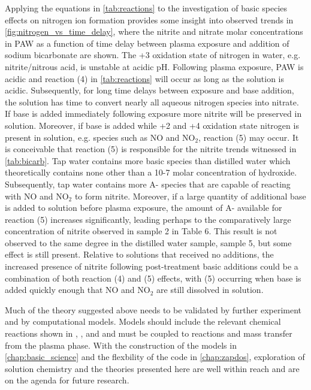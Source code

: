 Applying the equations in \cref{tab:reactions} to the investigation of basic species effects on nitrogen ion formation provides some insight into observed trends in \cref{fig:nitrogen_vs_time_delay}, where the nitrite and nitrate molar concentrations in PAW as a function of time delay between plasma exposure and addition of sodium bicarbonate are shown.  The +3 oxidation state of nitrogen in water, e.g. nitrite/nitrous acid, is unstable at acidic pH.  Following plasma exposure, PAW is acidic and reaction (4) in \cref{tab:reactions} will occur as long as the solution is acidic.  Subsequently, for long time delays between exposure and base addition, the solution has time to convert nearly all aqueous nitrogen species into nitrate.  If base is added immediately following exposure more nitrite will be preserved in solution.  Moreover, if base is added while +2 and +4 oxidation state nitrogen is present in solution, e.g. species such as NO and NO$_2$, reaction (5) may occur.  It is conceivable that reaction (5) is responsible for the nitrite trends witnessed in \cref{tab:bicarb}.  Tap water contains more basic species than distilled water which theoretically contains none other than a 10-7 molar concentration of hydroxide.  Subsequently, tap water contains more A- species that are capable of reacting with NO and NO$_2$ to form nitrite.  Moreover, if a large quantity of additional base is added to solution before plasma exposure, the amount of A- available for reaction (5) increases significantly, leading perhaps to the comparatively large concentration of nitrite observed in sample 2 in Table 6.  This result is not observed to the same degree in the distilled water sample, sample 5, but some effect is still present.  Relative to solutions that received no additions, the increased presence of nitrite following post-treatment basic additions could be a combination of both reaction (4) and (5) effects, with (5) occurring when base is added quickly enough that NO and NO$_2$ are still dissolved in solution.

Much of the theory suggested above needs to be validated by further experiment and by computational models.  Models should include the relevant chemical reactions shown in \cite{moussa2005acidity}, \cite{brisset2012peroxynitrite}, and \cite{greenwood1984chemistry} and must be coupled to reactions and mass transfer from the plasma phase. With the construction of the models in \cref{chap:basic_science} and the flexbility of the code in \cref{chap:zapdos}, exploration of solution chemistry and the theories presented here are well within reach and are on the agenda for future research.

